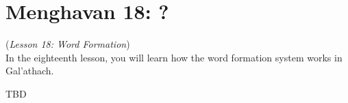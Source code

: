 \section{Menghavan 18: ?}
(\textit{Lesson 18: Word Formation})\\

In the eighteenth lesson, you will learn how the word formation system works in Gal'{a}thach.

TBD
